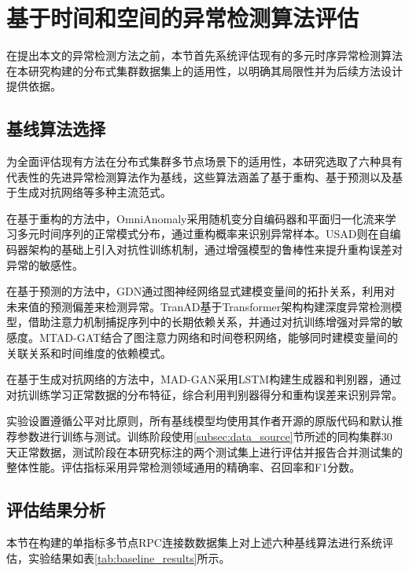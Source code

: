 \section{基于时间和空间的异常检测算法评估}\label{sec:method_eval}

在提出本文的异常检测方法之前，本节首先系统评估现有的多元时序异常检测算法在本研究构建的分布式集群数据集上的适用性，以明确其局限性并为后续方法设计提供依据。

\subsection{基线算法选择}\label{subsec:baseline}

为全面评估现有方法在分布式集群多节点场景下的适用性，本研究选取了六种具有代表性的先进异常检测算法作为基线，这些算法涵盖了基于重构、基于预测以及基于生成对抗网络等多种主流范式。

在基于重构的方法中，OmniAnomaly\cite{su2019omni}采用随机变分自编码器和平面归一化流来学习多元时间序列的正常模式分布，通过重构概率来识别异常样本。USAD\cite{audibert2020usad}则在自编码器架构的基础上引入对抗性训练机制，通过增强模型的鲁棒性来提升重构误差对异常的敏感性。

在基于预测的方法中，GDN\cite{deng2021graph}通过图神经网络显式建模变量间的拓扑关系，利用对未来值的预测偏差来检测异常。TranAD\cite{tuli2022tranad}基于Transformer架构构建深度异常检测模型，借助注意力机制捕捉序列中的长期依赖关系，并通过对抗训练增强对异常的敏感度。MTAD-GAT\cite{zhao2020mtadgat}结合了图注意力网络和时间卷积网络，能够同时建模变量间的关联关系和时间维度的依赖模式。

在基于生成对抗网络的方法中，MAD-GAN\cite{li2019madgan}采用LSTM构建生成器和判别器，通过对抗训练学习正常数据的分布特征，综合利用判别器得分和重构误差来识别异常。

实验设置遵循公平对比原则，所有基线模型均使用其作者开源的原版代码和默认推荐参数进行训练与测试。训练阶段使用\ref{subsec:data_source}节所述的同构集群30天正常数据，测试阶段在本研究标注的两个测试集上进行评估并报告合并测试集的整体性能。评估指标采用异常检测领域通用的精确率、召回率和F1分数。

\subsection{评估结果分析}\label{subsec:exp_results}

本节在构建的单指标多节点RPC连接数数据集上对上述六种基线算法进行系统评估，实验结果如表\ref{tab:baseline_results}所示。


